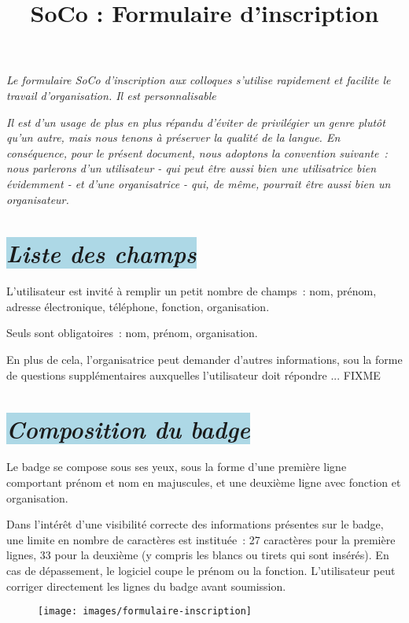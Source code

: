\documentclass[10pt,a4paper]{article}
\title{SoCo : Formulaire d'inscription}
\author{}
\date{}
\newcommand{\bleupale}[1]{\colorbox{LightBlue}{#1}}
\begin{document}
\pagestyle{empty}


\maketitle

\emph{Le formulaire SoCo d'inscription aux colloques s'utilise rapidement et facilite le travail d'organisation. Il est personnalisable}

\emph{Il est d'un usage de plus en plus répandu d'éviter de privilégier un genre plutôt qu'un autre, mais nous tenons à préserver la qualité de la langue. En conséquence, pour le présent document, nous adoptons la convention suivante : nous parlerons d'un utilisateur - qui peut être aussi bien une utilisatrice bien évidemment - et d'une organisatrice - qui, de même, pourrait être aussi bien un organisateur.}

\section*{\bleupale{\emph{Liste des champs}}}

L'utilisateur est invité à remplir un petit nombre de champs : nom, prénom, adresse électronique, téléphone, fonction, organisation.

Seuls sont obligatoires : nom, prénom, organisation.

En plus de cela, l'organisatrice peut demander d'autres informations, sou la forme de questions supplémentaires auxquelles l'utilisateur doit répondre ... FIXME

\section*{\bleupale{\emph{Composition du badge}}}

Le badge se compose sous ses yeux, sous la forme d'une première ligne comportant prénom et nom en majuscules, et une deuxième ligne avec fonction et organisation.

Dans l'intérêt d'une visibilité correcte des informations présentes sur le badge, une limite en nombre de caractères est instituée : 27 caractères pour la première lignes, 33 pour la deuxième (y compris les blancs ou tirets qui sont insérés). En cas de dépassement, le logiciel coupe le prénom ou la fonction. L'utilisateur peut corriger directement les lignes du badge avant soumission.

\begin{figure}[h]
  \texttt{[image: images/formulaire-inscription]}
\end{figure}
\end{document}
